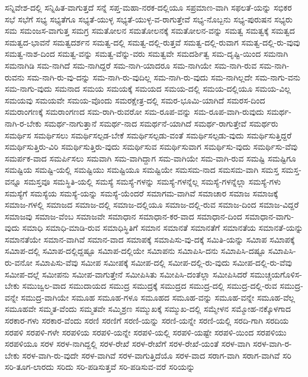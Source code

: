 {ಸನ್ನಿವೇಶ-ದಲ್ಲಿ
ಸನ್ನಿಹಿತ-ವಾಗುತ್ತದೆ
ಸನ್ನೆ
ಸಪ್ತ-ಮಹಾ-ನರಕ-ದಲ್ಲಿಯೂ
ಸಪ್ರಮಾಣ-ವಾಗಿ
ಸಫಲತೆ-ಯನ್ನು
ಸಭಿಕರ
ಸಭೆ
ಸಭೆಗೆ
ಸಭ್ಯ
ಸಭ್ಯತೆಗೂ
ಸಭ್ಯತೆ-ಯುಳ್ಳ
ಸಭ್ಯತೆ-ಯುಳ್ಳ-ವ-ರಾಗುತ್ತೇವೆ
ಸಭ್ಯ-ನೊಬ್ಬನು
ಸಭ್ಯ-ಪುರುಷನ
ಸಭ್ಯರು
ಸಮ
ಸಮಂಜಸ-ವಾಗುತ್ತ
ಸಮಗ್ರ
ಸಮತೋಲನ
ಸಮತೋಲನಕ್ಕೆ
ಸಮತೋಲನ-ವನ್ನು
ಸಮತ್ವ
ಸಮತ್ವಕ್ಕೆ
ಸಮತ್ವದ
ಸಮತ್ವದ-ಭಾವನೆ
ಸಮತ್ವದರ್ಶನ
ಸಮತ್ವ-ದಲ್ಲಿ
ಸಮತ್ವ-ದಲ್ಲಿ-ರುತ್ತವೆ
ಸಮತ್ವ-ದಲ್ಲಿ-ರುವಾಗ
ಸಮತ್ವ-ದಲ್ಲಿ-ರು-ವುವು
ಸಮತ್ವ-ನಾಶ-ದಿಂದ
ಸಮತ್ವ-ವನ್ನು
ಸಮತ್ವ-ವೆನ್ನು-ವರು
ಸಮತ್ವವೇ
ಸಮದರ್ಶಿತ್ವ
ಸಮ-ದೃಷ್ಟಿ-ಯಿಂದ
ಸಮನಾಗಿ
ಸಮನಾಗಿಡಿ
ಸಮ-ನಾಗಿದೆ
ಸಮ-ನಾಗಿದ್ದರೆ
ಸಮ-ನಾಗಿ-ಯಾದರೂ
ಸಮ-ನಾಗಿಯೇ
ಸಮ-ನಾಗಿ-ರುವ
ಸಮ-ನಾಗಿ-ರುವನು
ಸಮ-ನಾಗಿ-ರು-ವು-ದನ್ನು
ಸಮ-ನಾಗಿ-ರು-ವುದಿಲ್ಲ
ಸಮ-ನಾಗಿ-ರು-ವುದು
ಸಮ-ನಾಗಿಲ್ಲದೇ
ಸಮ-ನಾಗು-ವನು
ಸಮ-ನಾಗು-ವುದು
ಸಮನಾದ
ಸಮಯ
ಸಮಯಕ್ಕೆ
ಸಮಯದ
ಸಮಯ-ದಲ್ಲಿ
ಸಮಯ-ದಲ್ಲಿಯೂ
ಸಮಯ-ವಿಲ್ಲ
ಸಮಯವು
ಸಮಯವೇ
ಸಮಯ-ವೊಂದು
ಸಮರಕ್ಷೇತ್ರ-ದಲ್ಲಿ
ಸಮರ-ಭೂಮಿ-ಯಾಗಿದೆ
ಸಮರಸ-ದಿಂದ
ಸಮರಾಂಗಣಕ್ಕೆ
ಸಮರಾಂಗಣದ
ಸಮ-ರಾಗಿ-ರುವರೋ
ಸಮ-ರೂಪ-ವನ್ನು
ಸಮ-ರೂಪ-ವಾಗಿ-ರುವುದು
ಸಮರ್ಥ-ನಾಗಿ-ರ-ಬೇಕು
ಸಮರ್ಥ-ನಾಗುತ್ತಾನೆ
ಸಮರ್ಥ-ನಾದ
ಸಮರ್ಥನೆ-ಯಾಗಿದೆ
ಸಮರ್ಥ-ರಾಗುತ್ತೇವೆ
ಸಮರ್ಥರು
ಸಮರ್ಥಿಸ
ಸಮರ್ಥಿಸಲು
ಸಮರ್ಥಿಸಲ್ಪಡ-ಬೇಕೆ
ಸಮರ್ಥಿಸಲ್ಪಡು-ವಂತೆ
ಸಮರ್ಥಿಸಲ್ಪಡು-ವುದು
ಸಮರ್ಥಿಸುತ್ತಿದ್ದರೆ
ಸಮರ್ಥಿಸುತ್ತಿರು-ವಿರಿ
ಸಮರ್ಥಿಸುತ್ತಿರು-ವುದು
ಸಮರ್ಥಿಸುವ
ಸಮರ್ಥಿಸುವಾಗ
ಸಮರ್ಥಿಸು-ವುದು
ಸಮರ್ಥಿಸು-ವೆವು
ಸಮರ್ಪಕ-ವಾದ
ಸಮರ್ಪಿಸಲು
ಸಮವಾಗಿ
ಸಮ-ವಾಗಿದ್ದಾಗ
ಸಮ-ವಾಗಿಯೇ
ಸಮ-ವಾಗಿ-ರುವ
ಸಮಷ್ಟಿ
ಸಮಷ್ಟಿಗೂ
ಸಮಷ್ಟಿಯ
ಸಮಷ್ಟಿ-ಯಲ್ಲಿ
ಸಮಷ್ಟಿಯು
ಸಮಷ್ಟಿಯೂ
ಸಮಷ್ಟಿಯೇ
ಸಮಸಮ-ನಾದ
ಸಮಸಮ-ವಾಗಿ
ಸಮಸ್ತ
ಸಮಸ್ತ-ವನ್ನೂ
ಸಮಸ್ತವೂ
ಸಮಸ್ಥಿತಿ-ಯಲ್ಲಿ
ಸಮಸ್ಯೆ
ಸಮಸ್ಯೆ-ಗಳನ್ನು
ಸಮಸ್ಯೆ-ಗಳನ್ನೆಲ್ಲ
ಸಮಸ್ಯೆ-ಗಳನ್ನೆಲ್ಲಾ
ಸಮಸ್ಯೆ-ಗಳು
ಸಮಸ್ಯೆಗೆ
ಸಮಸ್ಯೆಯ
ಸಮಸ್ಯೆ-ಯನ್ನು
ಸಮಸ್ಯೆ-ಯೆಂದರೆ
ಸಮಾಗಮ-ವಾಗಿವೆ
ಸಮಾಚಾರ
ಸಮಾಜ
ಸಮಾಜಕ್ಕೆ
ಸಮಾಜ-ಗಳಲ್ಲಿ
ಸಮಾಜದ
ಸಮಾಜ-ದಲ್ಲಿ
ಸಮಾಜ-ದಲ್ಲಿಯೂ
ಸಮಾಜ-ದಲ್ಲಿ-ರುವ
ಸಮಾಜ-ದಿಂದ
ಸಮಾಜ-ವಿದ್ದರೆ
ಸಮಾಜವು
ಸಮಾಜ-ವೆಂಬ
ಸಮಾಜವೇ
ಸಮಾಧಾನ
ಸಮಾಧಾನ-ಕರ-ವಾದ
ಸಮಾಧಾನ-ದಿಂದ
ಸಮಾಧಾನ-ವಾಗು-ವುದು
ಸಮಾಧಿ
ಸಮಾಧಿ-ಮಾಡಿ-ರುವ
ಸಮಾಧಿಸ್ಥಿತಿಗೆ
ಸಮಾನ
ಸಮಾನತೆ
ಸಮಾನತೆಗೆ
ಸಮಾನತೆಯ
ಸಮಾನತೆ-ಯನ್ನು
ಸಮಾನತೆಯೇ
ಸಮಾನ-ವಾಗಿವೆ
ಸಮಾನ-ವಾದ
ಸಮಾಪಕ್ಕೆ
ಸಮಾಪಿಸು-ವು-ದಕ್ಕೆ
ಸಮಿತಿ-ಯನ್ನು
ಸಮಿಾಪ
ಸಮಿಾಪಕ್ಕೆ
ಸಮಿಾಪ-ದಲ್ಲಿ
ಸಮಿಾಪ-ದಲ್ಲಿದ್ದಷ್ಟೂ
ಸಮಿಾಪ-ದಲ್ಲಿಯೇ
ಸಮಿಾಪನು
ಸಮಿಾಪಿಸಿ-ದನು
ಸಮಿಾಪಿಸಿ-ದಷ್ಟೂ
ಸಮಿಾಪಿಸಿ-ರು-ವನೋ
ಸಮಿಾಪಿಸು-ವೆವು
ಸಮೀಪ
ಸಮೀಪಕ್ಕೆ
ಸಮೀಪ-ದಲ್ಲಿ
ಸಮೀಪ-ದಲ್ಲಿ-ರು-ವುದು
ಸಮೀಪ-ದಲ್ಲಿ-ರು-ವೆವು
ಸಮೀಪ-ದಲ್ಲೆ
ಸಮೀಪನು
ಸಮೀಪ-ವಾಗುತ್ತೇನೆ
ಸಮೀಪಿಸಿತು
ಸಮೀಪಿಸಿ-ದಂತೆಲ್ಲಾ
ಸಮೀಪಿಸಿದರೆ
ಸಮುಚ್ಚಯಗೊಳಿಸ-ಬೇಕು
ಸಮುಜ್ವಲ-ವಾದ
ಸಮುದಾಯದ
ಸಮುದ್ರ
ಸಮುದ್ರಕ್ಕೆ
ಸಮುದ್ರದ
ಸಮುದ್ರ-ದಲ್ಲಿ
ಸಮುದ್ರ-ದಲ್ಲಿ-ರುವ
ಸಮುದ್ರ-ವನ್ನೇ
ಸಮುದ್ರ-ವಾಗಿಯೇ
ಸಮೂಹ
ಸಮೂಹ-ಗಳೂ
ಸಮೂಹದ
ಸಮೂಹ-ವನ್ನು
ಸಮೂಹ-ವನ್ನೇ
ಸಮೂಹ-ವೆಲ್ಲ
ಸಮೂಹವೇ
ಸಮ್ಮತ-ವೆಂದು
ಸಮ್ಮತವೇ
ಸಮ್ಮಿಶ್ರಣ
ಸಮ್ಮುಖಕ್ಕೆ
ಸಮ್ಮುಖ-ದಲ್ಲಿ
ಸಮ್ಮೇಳನ
ಸಮ್ಮೋಹ-ನಕ್ಕೊಳಗಾದ
ಸರಕಾರ-ಗಳು
ಸರಕಾರ-ವೆಂದು
ಸರಣಿ
ಸರಣಿಗೆ
ಸರಣಿ-ಯನ್ನು
ಸರಣಿ-ಯನ್ನೇ
ಸರಣಿ-ಯಲ್ಲಿ
ಸರದಿ-ಗಾಗಿ
ಸರದಿಯ
ಸರಪಳಿ
ಸರಪಳಿ-ಗಳೇ
ಸರಪಳಿಯ
ಸರಪಳಿ-ಯನ್ನೇ
ಸರಪಳಿ-ಯಲ್ಲಿ
ಸರಪಳಿ-ಯಷ್ಟೇ
ಸರಪಳಿ-ಯಿಂದ
ಸರಪಳಿಯು
ಸರಪಳಿಯೂ
ಸರಳ
ಸರಳ-ನಾಗಿದ್ದಲ್ಲಿ
ಸರಳ-ರೇಖೆ
ಸರಳ-ರೇಖೆಗೆ
ಸರಳ-ರೇಖೆ-ಯಂತೆ
ಸರಳ-ವಾಗಿ
ಸರಳ-ವಾಗಿ-ರ-ಬೇಕು
ಸರಳ-ವಾಗಿ-ರು-ವುದೇ
ಸರಳ-ವಾಗಿವೆ
ಸರಳ-ವಾಗುತ್ತಿದೆಯೊ
ಸರಳ-ವಾದ
ಸರಾಗ-ವಾಗಿ
ಸರಾಗ-ವಾಗಿವೆ
ಸರಿ
ಸರಿ-ತೂಗ-ಲಾರದು
ಸರಿದು
ಸರಿ-ಪಡಿಸುತ್ತವೆ
ಸರಿ-ಪಡಿಸುವ-ವರೆ
ಸರಿಯನ್ನು
}
